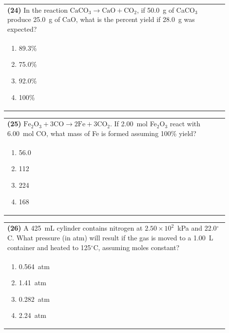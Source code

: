 \documentclass{article}
\begin{document}
\vspace{0.2cm}
\noindent\begin{tabular}{|p{0.9\linewidth}|}
\hline
\textbf{(24)} In the reaction $\text{CaCO}_3 \rightarrow \text{CaO} + \text{CO}_2$, if 50.0~g of CaCO$_3$ produce 25.0~g of CaO, what is the percent yield if 28.0~g was expected?\\[0.2cm]

\begin{minipage}[t]{0.85\linewidth}
\begin{enumerate}[label=\alph*.]
\item 89.3\%
\item 75.0\%
\item 92.0\%
\item 100\%
\end{enumerate}
\end{minipage}\\[0.2cm]
\hline
\end{tabular}

\newpage

\noindent\begin{tabular}{|p{0.9\linewidth}|}
\hline
\textbf{(25)} $\text{Fe}_2\text{O}_3 + 3\text{CO} \rightarrow 2\text{Fe} + 3\text{CO}_2$. If 2.00~mol Fe$_2$O$_3$ react with 6.00~mol CO, what mass of Fe is formed assuming 100\% yield?\\[0.2cm]

\begin{minipage}[t]{0.85\linewidth}
\begin{enumerate}[label=\alph*.]
\item 56.0
\item 112
\item 224
\item 168
\end{enumerate}
\end{minipage}\\[0.2cm]
\hline
\end{tabular}

\vspace{0.2cm}
\noindent\begin{tabular}{|p{0.9\linewidth}|}
\hline
\textbf{(26)} A 425~mL cylinder contains nitrogen at $2.50\times10^{2}$~kPa and 22.0$^\circ$C. What pressure (in atm) will result if the gas is moved to a 1.00~L container and heated to 125$^\circ$C, assuming moles constant?\\[0.2cm]

\begin{minipage}[t]{0.85\linewidth}
\begin{enumerate}[label=\alph*.]
\item 0.564~atm
\item 1.41~atm
\item 0.282~atm
\item 2.24~atm
\end{enumerate}
\end{minipage}\\[0.2cm]
\hline
\end{tabular}
\end{document}
